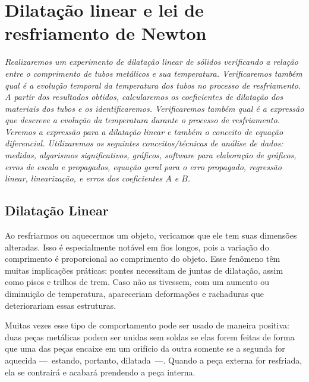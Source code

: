 \chapter{Dilatação linear e lei de resfriamento de Newton}
\label{Chap:ExpDilatacaoLinear}

\begin{fullwidth}\it
	Realizaremos um experimento de dilatação linear de sólidos verificando a relação entre o comprimento de tubos metálicos e sua temperatura. Verificaremos também qual é a evolução temporal da temperatura dos tubos no processo de resfriamento. A partir dos resultados obtidos, calcularemos os coeficientes de dilatação dos materiais dos tubos e os identificaremos. Verificaremos também qual é a expressão que descreve a evolução da temperatura durante o processo de resfriamento. Veremos a expressão para a dilatação linear e também o conceito de equação diferencial. Utilizaremos os seguintes conceitos/técnicas de análise de dados: medidas, algarismos significativos, gráficos, software para elaboração de gráficos, erros de escala e propagados, equação geral para o erro propagado, regressão linear, linearização, e erros dos coeficientes $A$ e $B$.
\end{fullwidth}

\section{Dilatação Linear}

Ao resfriarmos ou aquecermos um objeto, vericamos que ele tem suas dimensões alteradas. Isso é especialmente notável em fios longos, pois a variação do comprimento é proporcional ao comprimento do objeto. Esse fenômeno têm muitas implicações práticas: pontes necessitam de juntas de dilatação, assim como pisos e trilhos de trem. Caso não as tivessem, com um aumento ou diminuição de temperatura, apareceriam deformações e rachaduras que deteriorariam essas estruturas. 

Muitas vezes esse tipo de comportamento pode ser usado de maneira positiva: duas peças metálicas podem ser unidas sem soldas se elas forem feitas de forma que uma das peças encaixe em um orifício da outra somente se a segunda for aquecida ---~estando, portanto, dilatada~---. Quando a peça externa for resfriada, ela se contrairá e acabará prendendo a peça interna.

